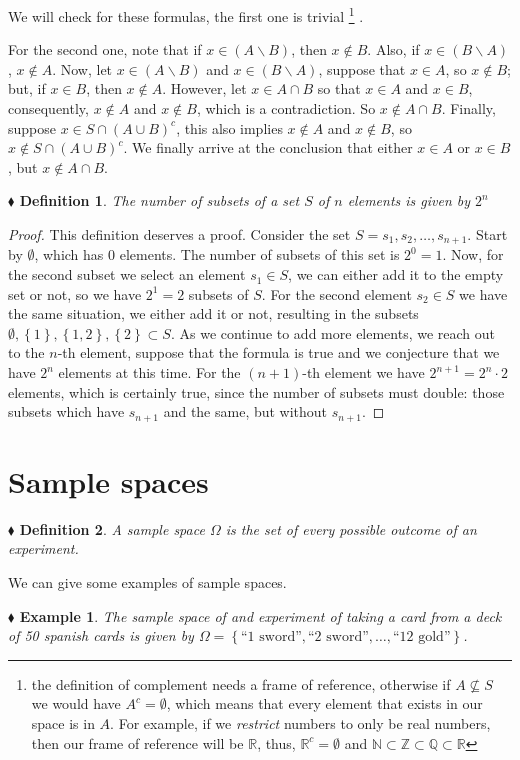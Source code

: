 \documentclass{report}
\newcommand*{\daggerfootnote}[1]{%
  \begingroup
  \renewcommand*{\thefootnote}{\fnsymbol{footnote}}%
  \footnote{#1}%
  \endgroup
}
\newtheorem{example}{$\blacklozenge$ Example}[chapter]
\newtheorem{definition}{$\blacklozenge$ Definition}[chapter]
\begin{document}
We will check for these formulas, the first one is trivial \daggerfootnote{the definition of complement needs a frame of reference, otherwise if $A\nsubseteq S$
    we would have $A^{c} = \emptyset$, which means that every element that exists in our space is in $A$.
    For example, if we \textit{restrict} numbers to only be real numbers, then our frame of reference will
    be $\mathbb{R}$, thus, $\mathbb{R}^{c} = \emptyset$ and $\mathbb{N}\subset\mathbb{Z}\subset\mathbb{Q}\subset\mathbb{R}$}.

For the second one, note that if $x\in (A\backslash B)$,
then $x\notin B$. Also, if $x\in (B\backslash A)$, $x\notin A$. Now, let $x\in (A\backslash B)$ and $x\in (B \backslash A)$,
suppose that $x\in A$, so $x\notin B$; but, if $x\in B$, then $x\notin A$. However, let $x\in A\cap B$ so that $x\in A$ and $x\in B$,
consequently, $x\notin A$ and $x\notin B$, which is a contradiction. So $x\notin A\cap B$. Finally, suppose $x\in S\cap (A\cup B)^{c}$,
this also implies $x\notin A$ and $x \notin B$, so $x\notin S\cap(A\cup B)^{c}$. We finally arrive at the conclusion that
either $x\in A$ or $x\in B$, but $x\notin A\cap B$.

\begin{definition}
    The number of subsets of a set $S$ of $n$ elements is given by $2^{n}$
\end{definition}

\begin{proof}
    This definition deserves a proof. Consider the set $S = {s_1, s_2, \dots, s_{n+1}}$. 
    Start by $\emptyset$, which has $0$ elements. The number of subsets of this set is $2^{0} = 1$. 
    Now, for the second subset we select an element $s_1\in S$, we can
    either add it to the empty set or not, so we have $2^{1} = 2$ subsets of $S$. For the second element $s_2 \in S$ we have
    the same situation, we either add it or not, resulting in the subsets $\emptyset, \left\{1\right\}, \left\{1,2\right\}, \left\{2\right\}\subset S$.
    As we continue to add more elements, we reach out to the $n$-th element, suppose that the formula is true 
    and we conjecture that we have $2^{n}$ elements at this time. For the $(n+1)$-th element we have 
    $2^{n+1} = 2^{n}\cdot2$ elements, which is certainly true, since the number of subsets must double: those subsets
    which have $s_{n+1}$ and the same, but without $s_{n+1}$.
\end{proof}

\section{Sample spaces}
\begin{definition}
    A sample space $\Omega$ is the set of \textit{every} possible outcome
    of an experiment.
\end{definition}
We can give some examples of sample spaces.
\begin{example}
    The sample space of and experiment of taking a card from a deck of 50 spanish cards is
    given by $\Omega = \left\{\text{``1 sword''}, \text{``2 sword''}, \dots, \text{``12 gold''}\right\}$.
\end{example}
\end{document}
